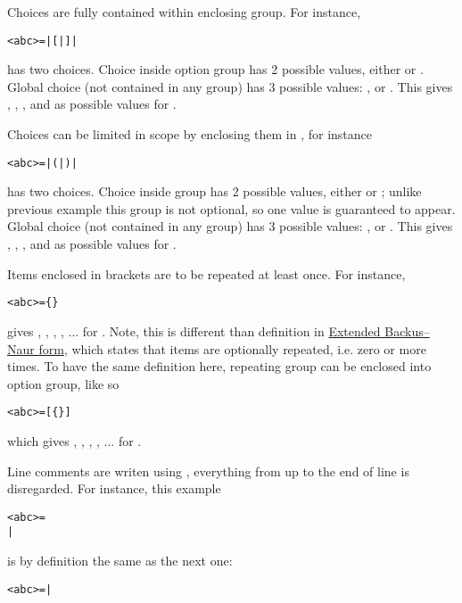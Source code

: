 \clearpage %

Choices are fully contained within enclosing group. For instance,
\begin{alltt}
<abc> =  |  [  |  ]  | 
\end{alltt}
has two choices. Choice inside option group \algfmt{[ ]} has 2 possible values,
either  or . Global choice (not contained in any group) has 3 possible
values: , \algfmt{[}\algfmt{|}\algfmt{]} or .
This gives , , ,  and  as possible values for
.

Choices can be limited in scope by enclosing them in \algfmt{( )},
for instance
\begin{alltt}
<abc> =  |  (  |  )  | 
\end{alltt}
has two choices. Choice inside group \algfmt{( )} has 2 possible values,
either  or ; unlike previous example this group is not optional, so one
value is guaranteed to appear. Global choice (not contained in any group) has 3 possible
values: , \algfmt{(}\algfmt{|}\algfmt{)}
or . This gives , , , and  as possible values
for .

Items enclosed in \algfmt{\{ \}} brackets are to be repeated at least once. For instance,
\begin{alltt}
<abc> =  \{  \} 
\end{alltt}
gives , , , , ... for . \newline
\indent
Note, this is different than definition in
\href{https://en.wikipedia.org/wiki/Extended_Backus%E2%80%93Naur_form#Table_of_symbols}{Extended Backus–Naur form},
which states that items are optionally repeated, i.e. zero or more times. \newline
\indent
To have the same definition here, repeating group can be enclosed into option group,
like so
\begin{alltt}
<abc> =  [ \{  \} ] 
\end{alltt}
which gives , , , , ... for .

Line comments are writen using \algfmti{\$}, everything from \algfmti{\$} up to the
end of line is disregarded. For instance, this example
\begin{alltt}
<abc> = 
   
|  
\end{alltt}
is by definition the same as the next one:
\begin{alltt}
<abc> =  | 
\end{alltt}

